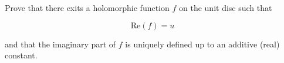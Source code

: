 Prove that there exits a holomorphic function $f$ on the unit disc such that

$$
\text{Re} (f) = u
$$

and that the imaginary part of $f$ is uniquely defined up to an additive (real) constant.